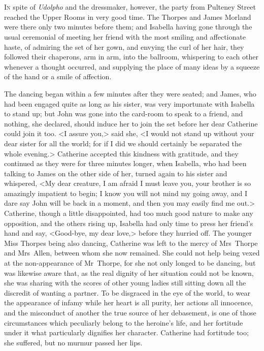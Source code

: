 \chapter[Chapter \thechapter]{} 

 \lettrine{I}{n} spite of \textit{Udolpho} and the dressmaker, however, the party from Pulteney Street reached the Upper Rooms in very good time. The Thorpes and James Morland were there only two minutes before them; and Isabella having gone through the usual ceremonial of meeting her friend with the most smiling and affectionate haste, of admiring the set of her gown, and envying the curl of her hair, they followed their chaperons, arm in arm, into the ballroom, whispering to each other whenever a thought occurred, and supplying the place of many ideas by a squeeze of the hand or a smile of affection. 

 The dancing began within a few minutes after they were seated; and James, who had been engaged quite as long as his sister, was very importunate with Isabella to stand up; but John was gone into the card-room to speak to a friend, and nothing, she declared, should induce her to join the set before her dear Catherine could join it too. <I assure you,> said she, <I would not stand up without your dear sister for all the world; for if I did we should certainly be separated the whole evening.> Catherine accepted this kindness with gratitude, and they continued as they were for three minutes longer, when Isabella, who had been talking to James on the other side of her, turned again to his sister and whispered, <My dear creature, I am afraid I must leave you, your brother is so amazingly impatient to begin; I know you will not mind my going away, and I dare say John will be back in a moment, and then you may easily find me out.> Catherine, though a little disappointed, had too much good nature to make any opposition, and the others rising up, Isabella had only time to press her friend's hand and say, <Good-bye, my dear love,> before they hurried off. The younger Miss Thorpes being also dancing, Catherine was left to the mercy of Mrs~Thorpe and Mrs~Allen, between whom she now remained. She could not help being vexed at the non-appearance of Mr~Thorpe, for she not only longed to be dancing, but was likewise aware that, as the real dignity of her situation could not be known, she was sharing with the scores of other young ladies still sitting down all the discredit of wanting a partner. To be disgraced in the eye of the world, to wear the appearance of infamy while her heart is all purity, her actions all innocence, and the misconduct of another the true source of her debasement, is one of those circumstances which peculiarly belong to the heroine's life, and her fortitude under it what particularly dignifies her character. Catherine had fortitude too; she suffered, but no murmur passed her lips. 

